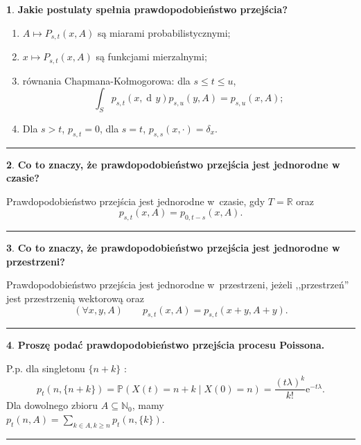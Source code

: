 \documentclass[
    twocolumn,
    twoside,
    fontsize=11pt,
    paper=A0,
    DIV=30
]{scrartcl}
\theoremstyle{definition}
\newtheorem{pytanie}{}
\theoremstyle{break}
\newenvironment{odpowiedź}{\vspace{-0.7em}}{\vspace{0.3em}\hrule}
\newcommand*{\e}{\mathrm{e}}
\DeclareMathOperator{\diff}{d\!}
\begin{document}
\begin{pytanie}
\textbf{Jakie postulaty spełnia prawdopodobieństwo przejścia?}
\end{pytanie}
\begin{odpowiedź}
\begin{enumerate}
    \item $A \mapsto P_{s,t} (x,A)$ są miarami probabilistycznymi;
    \item $x \mapsto P_{s,t}(x,A)$ są funkcjami mierzalnymi;
    \item równania Chapmana-Kołmogorowa: dla $s \leq t \leq u$, \[
    \int_S p_{s,t}(x, \diff y) p_{s, u}(y, A) = p_{s, u}(x, A);
    \] 
    \item Dla $s>t$, $p_{s, t} = 0$, dla $s = t$, $p_{s,s}(x, \cdot) = \delta_x$.
\end{enumerate}
\end{odpowiedź}


\begin{pytanie}
\textbf{Co to znaczy, że prawdopodobieństwo przejścia jest jednorodne w czasie?}
\end{pytanie}
\begin{odpowiedź}
    Prawdopodobieństwo przejścia jest jednorodne w~czasie,
    gdy $T=\mathbb{R}$ oraz
    \[p_{s, t} (x,A) = p_{0, t-s} (x,A).\]
\end{odpowiedź}


\begin{pytanie}
\textbf{Co to znaczy, że prawdopodobieństwo przejścia jest jednorodne w przestrzeni?}
\end{pytanie}
\begin{odpowiedź}
    Prawdopodobieństwo przejścia jest jednorodne w~przestrzeni,
    jeżeli ,,przestrzeń'' jest przestrzenią wektorową oraz \[
        (\forall x, y, A) \qquad p_{s, t}(x, A) = p_{s, t}(x + y, A + y).
    \] 
\end{odpowiedź}


\begin{pytanie}
\textbf{Proszę podać prawdopodobieństwo przejścia procesu Poissona.}
\end{pytanie}
\begin{odpowiedź}
    P.p. dla singletonu $\{n + k\}$ :
    \begin{equation}
        p_t(n, \{n + k\}) = \mathbb{P}(X(t) = n + k \mid X(0) = n)
        = \frac {(t\lambda)^k}{k!} \e^{-t\lambda}.
    \end{equation}
    Dla dowolnego zbioru $A \subseteq \mathbb{N}_0$, mamy\\
    $p_t(n, A) = \sum_{k \in A, k \geq n} p_t(n, \{k\})$.
\end{odpowiedź}
\end{document}
